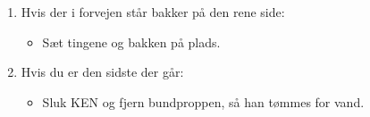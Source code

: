 \documentclass{article}
\begin{document}
\begin{enumerate}
\bfseries \item Hvis der i forvejen står bakker på den rene side: \normalfont

  \begin{itemize}

  \item Sæt tingene og bakken på plads.

  \end{itemize}

\bfseries \item Hvis du er den sidste der går: \normalfont

  \begin{itemize}

  \item Sluk KEN og fjern bundproppen, så han tømmes for vand.

  \end{itemize}

\end{enumerate}

\underskriv
\end{document}
